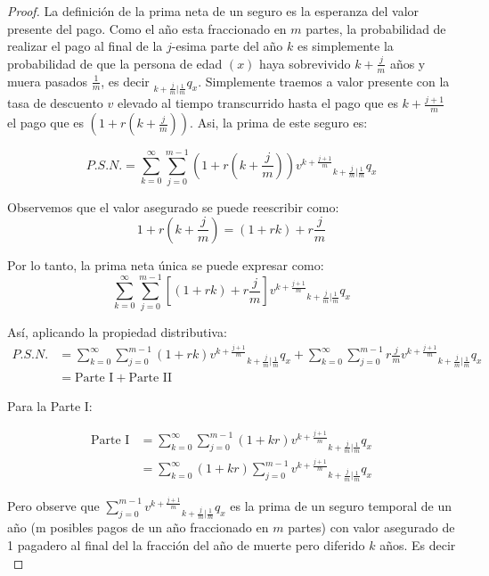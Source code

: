 \begin{proof}

    La definición de la prima neta de un seguro es la esperanza del valor presente del pago. Como el año esta fraccionado en $m$ partes, la probabilidad de realizar el pago al final de la $j$-esima parte del año $k$ es simplemente la probabilidad de que la persona de edad $(x)$ haya sobrevivido $k+\frac{j}{m}$ años y muera pasados $\frac{1}{m}$, es decir ${}_{k + \frac{j}{m}|\frac{1}{m}}q_x$. Simplemente traemos a valor presente con la tasa de descuento $v$ elevado al tiempo transcurrido hasta el pago que es $k + \frac{j+1}{m}$ el pago que es $(1 + r(k + \frac{j}{m}))$. Asi, la prima de este seguro es: 

    \begin{equation}
        P.S.N. = \sum_{k=0}^\infty \sum_{j=0}^{m-1} \left(1+r\left(k+\frac{j}{m}\right)\right) v^{k+\frac{j+1}{m}} {}_{k + \frac{j}{m}|\frac{1}{m}} q_x
    \end{equation}

    Observemos que el valor asegurado se puede reescribir como:
    \[1 + r\left(k + \frac{j}{m}\right) = (1 + rk) + r \frac{j}{m}\]
    
    Por lo tanto, la prima neta única se puede expresar como:
    \[\sum_{k=0}^\infty \sum_{j=0}^{m-1} \left[(1 + rk) + r \frac{j}{m}\right] v^{k+\frac{j+1}{m}} {}_{k + \frac{j}{m}|\frac{1}{m}} q_x\]
    
    Así, aplicando la propiedad distributiva:
    \begin{align*}
    P.S.N. &= \sum_{k=0}^\infty \sum_{j=0}^{m-1} (1 + rk) v^{k+\frac{j+1}{m}} {}_{k + \frac{j}{m}|\frac{1}{m}} q_x + \sum_{k=0}^\infty \sum_{j=0}^{m-1} r \frac{j}{m} v^{k+\frac{j+1}{m}} {}_{k + \frac{j}{m}|\frac{1}{m}} q_x \\
    &= \text{Parte I} + \text{Parte II}
    \end{align*}
    
    Para la Parte I:
    
    \begin{align*}
        \text{Parte I} &= \sum_{k=0}^\infty \sum_{j=0}^{m-1} (1 + kr) v^{k+\frac{j+1}{m}} {}_{k+\frac{j}{m}|\frac{1}{m}} q_x \\
        &= \sum_{k=0}^\infty (1 + kr) \sum_{j=0}^{m-1} v^{k+\frac{j+1}{m}} {}_{k+\frac{j}{m}|\frac{1}{m}} q_x 
    \end{align*}

    Pero observe que $\sum_{j=0}^{m-1} v^{k+\frac{j+1}{m}} {}_{k+\frac{j}{m}|\frac{1}{m}} q_x$ es la prima de un seguro temporal de un año (m posibles pagos de un año fraccionado en $m$ partes) con valor asegurado de 1 pagadero al final del la fracción del año de muerte pero diferido $k$ años. Es decir\\


\end{proof}
